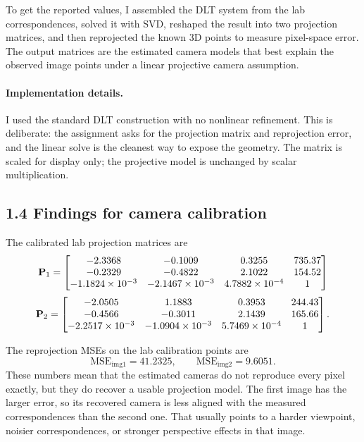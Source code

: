 {To get the reported values, I assembled the DLT system from the lab correspondences, solved it with SVD, reshaped the result into two projection matrices, and then reprojected the known 3D points to measure pixel-space error. The output matrices are the estimated camera models that best explain the observed image points under a linear projective camera assumption.

\paragraph{Implementation details.}
I used the standard DLT construction with no nonlinear refinement. This is deliberate: the assignment asks for the projection matrix and reprojection error, and the linear solve is the cleanest way to expose the geometry. The matrix is scaled for display only; the projective model is unchanged by scalar multiplication.

\subsection*{1.4 Findings for camera calibration}
The calibrated lab projection matrices are
\begin{equation*}
\mathbf{P}_1 =
\begin{bmatrix}
-2.3368 & -0.1009 & 0.3255 & 735.37\\
-0.2329 & -0.4822 & 2.1022 & 154.52\\
-1.1824\times 10^{-3} & -2.1467\times 10^{-3} & 4.7882\times 10^{-4} & 1
\end{bmatrix}
\end{equation*}
\begin{equation*}
\mathbf{P}_2 =
\begin{bmatrix}
-2.0505 & 1.1883 & 0.3953 & 244.43\\
-0.4566 & -0.3011 & 2.1439 & 165.66\\
-2.2517\times 10^{-3} & -1.0904\times 10^{-3} & 5.7469\times 10^{-4} & 1
\end{bmatrix}.
\end{equation*}

The reprojection MSEs on the lab calibration points are
\begin{equation}
\text{MSE}_{\text{img1}}=41.2325, \qquad \text{MSE}_{\text{img2}}=9.6051.
\end{equation}
These numbers mean that the estimated cameras do not reproduce every pixel exactly, but they do recover a usable projection model. The first image has the larger error, so its recovered camera is less aligned with the measured correspondences than the second one. That usually points to a harder viewpoint, noisier correspondences, or stronger perspective effects in that image.

}
